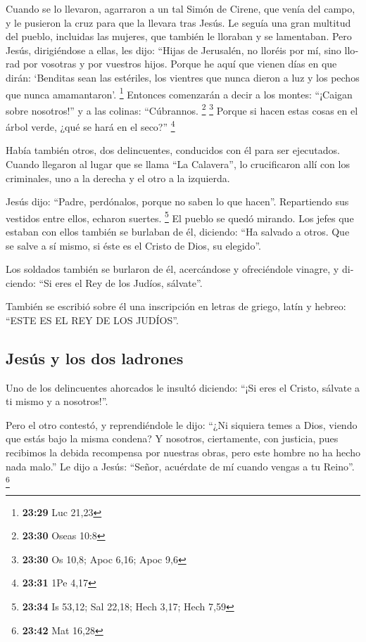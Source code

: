 \begin{paracol}{2}
\begin{otherlanguage}{english}
 Cuando se lo llevaron, agarraron a un tal Simón de
Cirene, que venía del campo, y le pusieron la cruz para que la llevara
tras Jesús.  Le seguía una gran multitud del pueblo,
incluidas las mujeres, que también le lloraban y se lamentaban.
 Pero Jesús, dirigiéndose a ellas, les dijo: ``Hijas de
Jerusalén, no lloréis por mí, sino llorad por vosotras y por vuestros
hijos.  Porque he aquí que vienen días en que dirán:
`Benditas sean las estériles, los vientres que nunca dieron a luz y los
pechos que nunca amamantaron'. \footnote{\textbf{23:29} Luc 21,23}
 Entonces comenzarán a decir a los montes: ``¡Caigan
sobre nosotros!'' y a las colinas: ``Cúbrannos. \footnote{\textbf{23:30}
  Oseas 10:8} \footnote{\textbf{23:30} Os 10,8; Apoc 6,16; Apoc 9,6}
 Porque si hacen estas cosas en el árbol verde, ¿qué se
hará en el seco?'' \footnote{\textbf{23:31} 1Pe 4,17}

 Había también otros, dos delincuentes, conducidos con él
para ser ejecutados.  Cuando llegaron al lugar que se
llama ``La Calavera'', lo crucificaron allí con los criminales, uno a la
derecha y el otro a la izquierda.

 Jesús dijo: ``Padre, perdónalos, porque no saben lo que
hacen''. Repartiendo sus vestidos entre ellos, echaron suertes.
\footnote{\textbf{23:34} Is 53,12; Sal 22,18; Hech 3,17; Hech 7,59}
 El pueblo se quedó mirando. Los jefes que estaban con
ellos también se burlaban de él, diciendo: ``Ha salvado a otros. Que se
salve a sí mismo, si éste es el Cristo de Dios, su elegido''.

 Los soldados también se burlaron de él, acercándose y
ofreciéndole vinagre,  y diciendo: ``Si eres el Rey de
los Judíos, sálvate''.

 También se escribió sobre él una inscripción en letras
de griego, latín y hebreo: ``ESTE ES EL REY DE LOS JUDÍOS''.

\hypertarget{jesuxfas-y-los-dos-ladrones}{%
\subsection{Jesús y los dos
ladrones}\label{jesuxfas-y-los-dos-ladrones}}

 Uno de los delincuentes ahorcados le insultó diciendo:
``¡Si eres el Cristo, sálvate a ti mismo y a nosotros!''.

 Pero el otro contestó, y reprendiéndole le dijo: ``¿Ni
siquiera temes a Dios, viendo que estás bajo la misma condena?
 Y nosotros, ciertamente, con justicia, pues recibimos la
debida recompensa por nuestras obras, pero este hombre no ha hecho nada
malo.''  Le dijo a Jesús: ``Señor, acuérdate de mí cuando
vengas a tu Reino''. \footnote{\textbf{23:42} Mat 16,28}


\end{otherlanguage}
\end{paracol}
